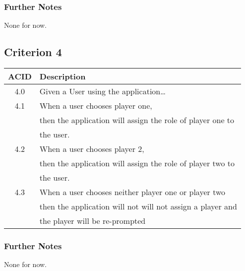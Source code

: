 \documentclass[11pt]{article}
\begin{document}
\subsubsection*{Further Notes}
\label{sec:orga88a572}
None for now.

\subsection{Criterion 4}
\label{sec:orgd18733b}
\begin{center}
\begin{tabular}{|c|l|}
ACID & Description\\
\hline
4.0 & Given a User using the application\ldots{}\\
\hline
4.1 & When a user chooses player one,\\
 & then the application will assign the role of player one to\\
 & the user.\\
4.2 & When a user chooses player 2,\\
 & then the application will assign the role of player two to\\
 & the user.\\
4.3 & When a user chooses neither player one or player two\\
 & then the application will not will not assign a player and\\
 & the player will be re-prompted\\
\end{tabular}
\end{center}

\subsubsection*{Further Notes}
\label{sec:org4244f11}
None for now.
\end{document}
